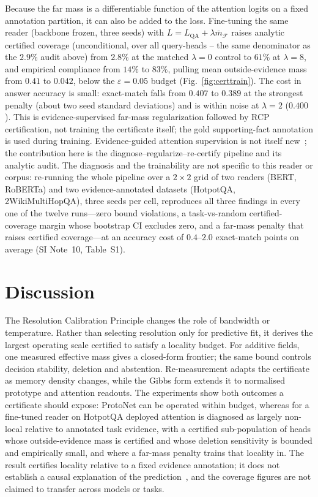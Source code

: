 \documentclass[10pt,twocolumn]{article}
\begin{document}
Because the far mass is a differentiable function of the attention logits on a fixed annotation partition, it can also be added to the loss. Fine-tuning the same reader (backbone frozen, three seeds) with $L=L_{\mathrm{QA}}+\lambda\bar m_{\mathcal{F}}$ raises analytic certified coverage (unconditional, over all query-heads -- the same denominator as the $2.9\%$ audit above) from $2.8\%$ at the matched $\lambda{=}0$ control to $61\%$ at $\lambda{=}8$, and empirical compliance from $14\%$ to $83\%$, pulling mean outside-evidence mass from $0.41$ to $0.042$, below the $\varepsilon=0.05$ budget (Fig.~\ref{fig:certtrain}). The cost in answer accuracy is small: exact-match falls from $0.407$ to $0.389$ at the strongest penalty (about two seed standard deviations) and is within noise at $\lambda{=}2$ ($0.400$). This is evidence-supervised far-mass regularization followed by RCP certification, not training the certificate itself; the gold supporting-fact annotation is used during training. Evidence-guided attention supervision is not itself new~\cite{zou2018,ma2023}; the contribution here is the diagnose--regularize--re-certify pipeline and its analytic audit. The diagnosis and the trainability are not specific to this reader or corpus: re-running the whole pipeline over a $2\times2$ grid of two readers (BERT, RoBERTa) and two evidence-annotated datasets (HotpotQA, 2WikiMultiHopQA), three seeds per cell, reproduces all three findings in every one of the twelve runs---zero bound violations, a task-vs-random certified-coverage margin whose bootstrap CI excludes zero, and a far-mass penalty that raises certified coverage---at an accuracy cost of $0.4$--$2.0$ exact-match points on average (SI Note~10, Table~S1).

\section{Discussion}

The Resolution Calibration Principle changes the role of bandwidth or temperature. Rather than selecting resolution only for predictive fit, it derives the largest operating scale certified to satisfy a locality budget. For additive fields, one measured effective mass gives a closed-form frontier; the same bound controls decision stability, deletion and abstention. Re-measurement adapts the certificate as memory density changes, while the Gibbs form extends it to normalised prototype and attention readouts. The experiments show both outcomes a certificate should expose: ProtoNet can be operated within budget, whereas for a fine-tuned reader on HotpotQA deployed attention is diagnosed as largely non-local relative to annotated task evidence, with a certified sub-population of heads whose outside-evidence mass is certified and whose deletion sensitivity is bounded and empirically small, and where a far-mass penalty trains that locality in. The result certifies locality relative to a fixed evidence annotation; it does not establish a causal explanation of the prediction~\cite{jain2019,wiegreffe2019}, and the coverage figures are not claimed to transfer across models or tasks.
\end{document}
